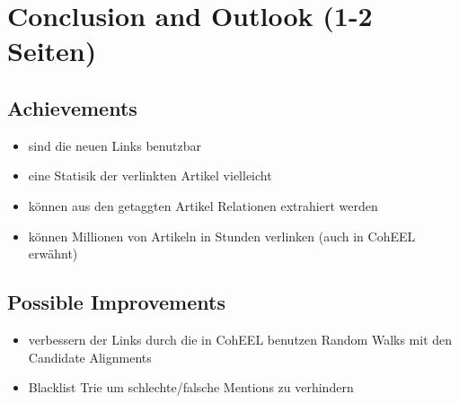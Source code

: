 \section{Conclusion and Outlook (1-2 Seiten)}
	\subsection{Achievements}
	\begin{itemize}
		\item sind die neuen Links benutzbar
		\item eine Statisik der verlinkten Artikel vielleicht
		\item können aus den getaggten Artikel Relationen extrahiert werden
		\item können Millionen von Artikeln in Stunden verlinken (auch in CohEEL erwähnt)
	\end{itemize}

	\subsection{Possible Improvements}
	\begin{itemize}
		\item verbessern der Links durch die in CohEEL benutzen Random Walks mit den Candidate Alignments
		\item Blacklist Trie um schlechte/falsche Mentions zu verhindern
	\end{itemize}

